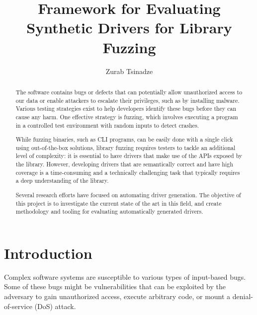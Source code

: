 \documentclass[a4paper,11pt,oneside]{report}
\title{Framework for Evaluating Synthetic Drivers for Library Fuzzing}
\author{Zurab Tsinadze}
\begin{document}
\maketitle

\begin{abstract}

The software contains bugs or defects that can potentially allow unauthorized
access to our data or enable attackers to escalate their privileges, such as
by installing malware. Various testing strategies exist to help developers
identify these bugs before they can cause any harm. One effective strategy is
fuzzing, which involves executing a program in a controlled test environment
with random inputs to detect crashes.

While fuzzing binaries, such as CLI programs, can be easily done with a
single click using out-of-the-box solutions, library fuzzing requires testers
to tackle an additional level of complexity: it is essential to have drivers
that make use of the APIs exposed by the library. However, developing drivers
that are semantically correct and have high coverage is a time-consuming and
a technically challenging task that typically requires a deep understanding 
of the library.

Several research efforts have focused on automating driver generation. The 
objective of this project is to investigate the current state of the art in
this field, and create methodology and tooling for evaluating automatically
generated drivers.

\end{abstract}


\maketoc


\chapter{Introduction}
Complex software systems are susceptible to various types of input-based bugs.
Some of these bugs might be vulnerabilities that can be exploited by the 
adversary to gain unauthorized access, execute arbitrary code, or mount
a denial-of-service (DoS) attack. 
\end{document}
